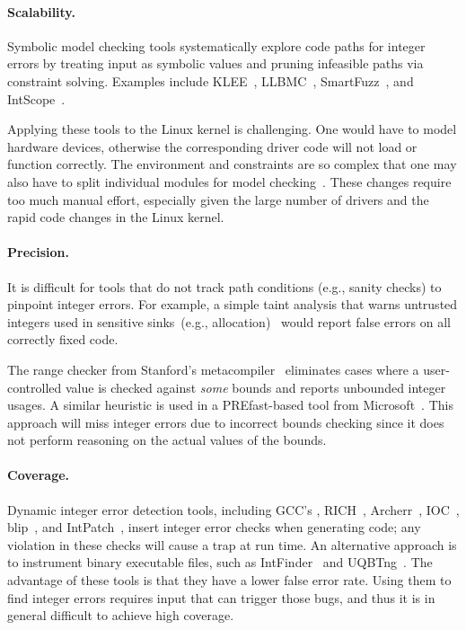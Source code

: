 
\paragraph{Scalability.}
Symbolic model checking tools systematically explore code paths
for integer errors by treating input as symbolic values and pruning
infeasible paths via constraint solving.  Examples include
KLEE~\cite{cadar:klee},
LLBMC~\cite{llbmc},
SmartFuzz~\cite{molnar:catchconv},
and
IntScope~\cite{intscope}.

Applying these tools to the Linux kernel is challenging.  One would
have to model hardware devices, otherwise the corresponding driver
code will not load or function correctly.  The environment and
constraints are so complex that one may also have to split
individual modules for model checking~\cite{engler:vs}.  These
changes require too much manual effort, especially given the
large number of drivers and the rapid code changes in the Linux
kernel.

\paragraph{Precision.}
It is difficult for tools that do not track path conditions (e.g.,
sanity checks) to pinpoint integer errors.  For example, a simple
taint analysis that warns untrusted integers used in sensitive
sinks~(e.g., allocation)~\cite{cqual, lclint} would report false
errors on all correctly fixed code.

The range checker from Stanford's metacompiler~\cite{range-checker}
eliminates cases where a user-controlled value is checked against
\emph{some} bounds and reports unbounded integer usages.  A similar heuristic
is used in a PREfast-based tool from Microsoft~\cite{prefast}.  This
approach will miss integer errors due to incorrect bounds checking since
it does not perform reasoning on the actual values of the bounds.

\paragraph{Coverage.}
Dynamic integer error detection tools,
including
GCC's ,
RICH~\cite{brumley:rich},
Archerr~\cite{archerr},
IOC~\cite{ioc},
blip~\cite{blip},
and
IntPatch~\cite{intpatch},
insert integer error checks when generating code; any violation in
these checks will cause a trap at run time.
%
%
An alternative approach is to instrument binary executable files,
such as IntFinder~\cite{intfinder} and UQBTng~\cite{uqbtng}.
%
The advantage of these tools is that they have a lower false error rate.
Using them to find integer errors requires input that can trigger
those bugs, and thus it is in general difficult to achieve high
coverage.

